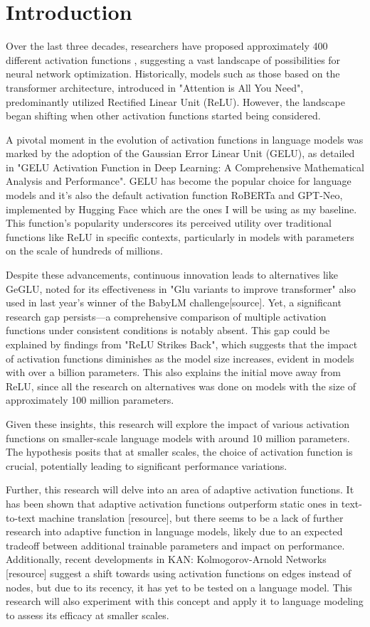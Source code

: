 \section{Introduction}
Over the last three decades, researchers have proposed approximately 400 different activation functions \cite{Kunc2024}, suggesting a vast landscape of possibilities for neural network optimization. Historically, models such as those based on the transformer architecture, introduced in "Attention is All You Need", predominantly utilized Rectified Linear Unit (ReLU). However, the landscape began shifting when other activation functions started being considered.

A pivotal moment in the evolution of activation functions in language models was marked by the adoption of the Gaussian Error Linear Unit (GELU), as detailed in "GELU Activation Function in Deep Learning: A Comprehensive Mathematical Analysis and Performance". GELU has become the popular choice for language models and it's also the default activation function RoBERTa and GPT-Neo, implemented by Hugging Face which are the ones I will be using as my baseline. This function's popularity underscores its perceived utility over traditional functions like ReLU in specific contexts, particularly in models with parameters on the scale of hundreds of millions.

Despite these advancements, continuous innovation leads to alternatives like GeGLU, noted for its effectiveness in "Glu variants to improve transformer" also used in last year's winner of the BabyLM challenge[source]. Yet, a significant research gap persists—a comprehensive comparison of multiple activation functions under consistent conditions is notably absent. This gap could be explained by findings from "ReLU Strikes Back", which suggests that the impact of activation functions diminishes as the model size increases, evident in models with over a billion parameters. This also explains the initial move away from ReLU, since all the research on alternatives was done on models with the size of approximately 100 million parameters.

Given these insights, this research will explore the impact of various activation functions on smaller-scale language models with around 10 million parameters. The hypothesis posits that at smaller scales, the choice of activation function is crucial, potentially leading to significant performance variations.

Further, this research will delve into an area of adaptive activation functions. It has been shown that adaptive activation functions outperform static ones in text-to-text machine translation [resource], but there seems to be a lack of further research into adaptive function in language models, likely due to an expected tradeoff between additional trainable parameters and impact on performance. Additionally, recent developments in KAN: Kolmogorov-Arnold Networks [resource] suggest a shift towards using activation functions on edges instead of nodes, but due to its recency, it has yet to be tested on a language model. This research will also experiment with this concept and apply it to language modeling to assess its efficacy at smaller scales.

